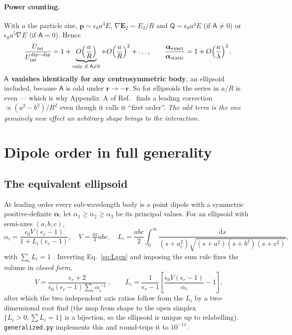 \documentclass[11pt,a4paper]{article}
\newcommand{\dd}{\mathrm{d}}
\newcommand{\bal}{\boldsymbol{\alpha}}
\begin{document}
\paragraph{Power counting.}
With $a$ the particle size, $\mathbf p\sim\epsilon_0a^{3}E$,
$\nabla\mathbf E_2\sim E_2/R$ and $\mathsf Q\sim\epsilon_0a^{4}E$ (if
$\mathsf A\neq0$) or $\epsilon_0a^{5}\nabla E$ (if $\mathsf A=0$).  Hence
\begin{equation}
  \frac{U_{\rm int}}{U_{\rm int}^{\rm dip-dip}}
  =1+\underbrace{O\!\left(\frac{a}{R}\right)}_{\text{only if }\mathsf A\neq0}
  +O\!\left(\frac{a}{R}\right)^{2}+\dots,
  \qquad
  \frac{\bal_{\rm exact}}{\bal_{\rm static}}=1+O\!\left(\frac{a}{\lambda}\right)^{2}.
  \label{eq:counting}
\end{equation}
\textbf{$\mathsf A$ vanishes identically for any centrosymmetric body}, an
ellipsoid included, because $\mathsf A$ is odd under $\mathbf r\to-\mathbf r$.
So for ellipsoids the series in $a/R$ is even --- which is why Appendix~A of
Ref.~\cite{Zhang2025} finds a leading correction $\propto(a^{2}-b^{2})/R^{2}$
even though it calls it ``first order''.  \emph{The odd term is the one genuinely
new effect an arbitrary shape brings to the interaction.}

\section{Dipole order in full generality}

\subsection{The equivalent ellipsoid}
\label{sec:equiv}

At leading order every sub-wavelength body is a point dipole with a symmetric
positive-definite $\bal$; let $\alpha_1\ge\alpha_2\ge\alpha_3$ be its principal
values.  For an ellipsoid with semi-axes $(a,b,c)$,
\begin{equation}
  \alpha_i=\frac{\epsilon_0V(\epsilon_r-1)}{1+L_i(\epsilon_r-1)},\quad
  V=\tfrac{4\pi}{3}abc,\quad
  L_i=\frac{abc}{2}\!\int_0^{\infty}\!\!
  \frac{\dd s}{(s+a_i^{2})\sqrt{(s+a^{2})(s+b^{2})(s+c^{2})}},
  \label{eq:Lgen}
\end{equation}
with $\sum_iL_i=1$ \cite{Osborn,Landau}.  Inverting Eq.~\eqref{eq:Lgen} and
imposing the sum rule fixes the volume in \emph{closed form},
\begin{equation}
  \boxed{\;V=\frac{\epsilon_r+2}{\epsilon_0(\epsilon_r-1)\sum_i\alpha_i^{-1}}\;},
  \qquad
  L_i=\frac{1}{\epsilon_r-1}\left[\frac{\epsilon_0V(\epsilon_r-1)}{\alpha_i}-1\right],
  \label{eq:equiv}
\end{equation}
after which the two independent axis ratios follow from the $L_i$ by a
two-dimensional root find (the map from shape to the open simplex
$\{L_i>0,\sum L_i=1\}$ is a bijection, so the ellipsoid is unique up to
relabelling).  \texttt{generalized.py} implements this and round-trips it to
$10^{-11}$.
\end{document}
